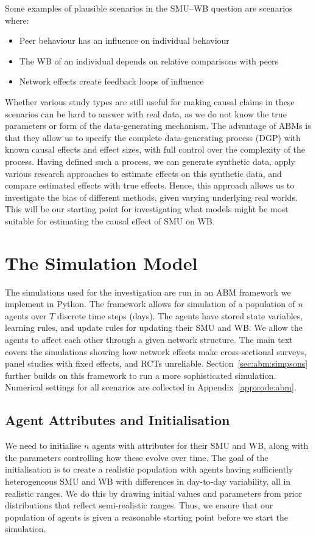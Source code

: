 Some examples of plausible scenarios in the SMU--WB question are scenarios where:
\begin{itemize}
    \item Peer behaviour has an influence on individual behaviour
    \item The WB of an individual depends on relative comparisons with peers
    \item Network effects create feedback loops of influence
\end{itemize}

Whether various study types are still useful for making causal claims in these scenarios can be hard to answer with real data, as we do not know the true parameters or form of the data-generating mechanism. The advantage of ABMs is that they allow us to specify the complete data-generating process (DGP) with known causal effects and effect sizes, with full control over the complexity of the process. Having defined such a process, we can generate synthetic data, apply various research approaches to estimate effects on this synthetic data, and compare estimated effects with true effects. Hence, this approach allows us to investigate the bias of different methods, given varying underlying real worlds. This will be our starting point for investigating what models might be most suitable for estimating the causal effect of SMU on WB\@.

\section{The Simulation Model}
\label{sec:abm:model}
The simulations used for the investigation are run in an ABM framework we implement in Python. The framework allows for simulation of a population of $n$ agents over $T$ discrete time steps (days). The agents have stored state variables, learning rules, and update rules for updating their SMU and WB\@. We allow the agents to affect each other through a given network structure. The main text covers the simulations showing how network effects make cross-sectional surveys, panel studies with fixed effects, and RCTs unreliable. Section~\ref{sec:abm:simpsons} further builds on this framework to run a more sophisticated simulation. Numerical settings for all scenarios are collected in Appendix~\ref{app:code:abm}.

\subsection{Agent Attributes and Initialisation}
\label{sec:abm:attributes}
We need to initialise $n$ agents with attributes for their SMU and WB, along with the parameters controlling how these evolve over time. The goal of the initialisation is to create a realistic population with agents having sufficiently heterogeneous SMU and WB with differences in day-to-day variability, all in realistic ranges. We do this by drawing initial values and parameters from prior distributions that reflect semi-realistic ranges. Thus, we ensure that our population of agents is given a reasonable starting point before we start the simulation.


